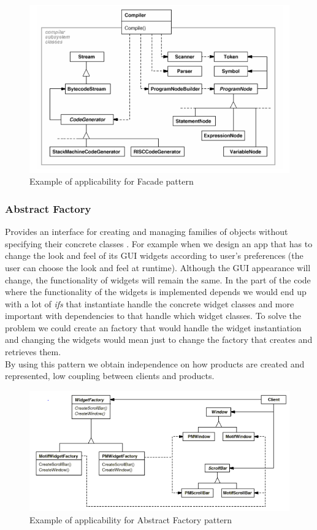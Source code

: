\documentclass{article}[11]
\begin{document}
	\begin{figure}[H]
		\includegraphics[scale=0.8]{./imgs/Facade}
		\caption{Example of applicability for Facade pattern  \cite{gamma1995design}}
	\end{figure}
	
	\subsubsection{Abstract Factory}
		Provides an interface for creating and managing families of objects without specifying their concrete classes \cite{gamma1995design}. For example when we design an app that has to change the look and feel of its GUI widgets according to user's preferences (the user can choose the look and feel at runtime). Although the GUI appearance will change, the functionality of widgets will remain the same. In the part of the code where the functionality of the widgets is implemented depends we would end up with a lot of \emph{ifs} that instantiate handle the concrete widget classes and more important with dependencies to that handle which widget classes. To solve the problem we could create an factory that would handle the widget instantiation and changing the widgets would mean just to change the factory that creates and retrieves them.\\
		By using this pattern we obtain independence on how products are created and represented, low coupling between clients and products. 
		\begin{figure}[H]
	
			\includegraphics[scale=0.75]{./imgs/Factory}
			\caption{Example of applicability for Abstract Factory pattern \cite{gamma1995design}}
		\end{figure}
\end{document}
